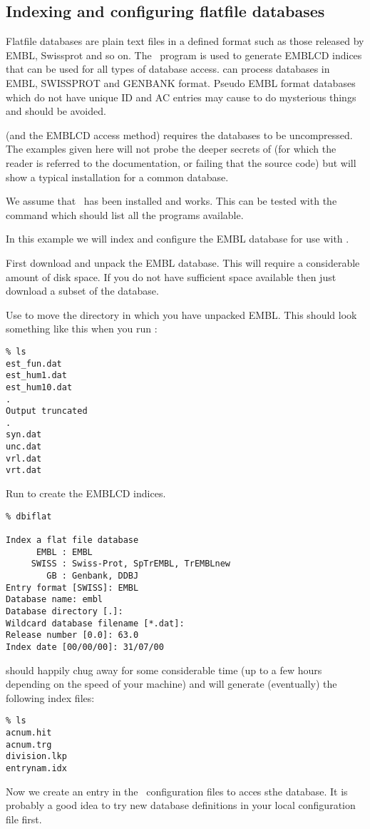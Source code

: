 \documentclass{report}
\begin{document}
	\subsection{Indexing and configuring flatfile databases}

Flatfile databases are plain text files in a defined format such as those released by EMBL, Swissprot and so on. The \EMBOSS\ program  is used to generate EMBLCD indices that can be used for all types of database access.  can process databases in EMBL, SWISSPROT and GENBANK format. Pseudo EMBL format databases which do not have unique ID and AC entries may cause  to do mysterious things and should be avoided.

 (and the EMBLCD access method) requires the databases to be uncompressed. The examples given here will not probe the deeper secrets of  (for which the reader is referred to the documentation, or failing that the source code) but will show a typical installation for a common database.

We assume that \EMBOSS\ has been installed and works. This can be tested with the command  which should list all the programs available.

In this example we will index and configure the EMBL database for use with \EMBOSS.

First download and unpack the EMBL database. This will require a considerable amount of disk space. If you do not have sufficient space available then just download a subset of the database.

Use  to move the directory in which you have unpacked EMBL. This should look something like this when you run :
\begin{verbatim}
% ls
est_fun.dat
est_hum1.dat
est_hum10.dat
.
Output truncated
.
syn.dat
unc.dat
vrl.dat
vrt.dat
\end{verbatim}
Run  to create the EMBLCD indices.
\begin{verbatim}
% dbiflat

Index a flat file database
      EMBL : EMBL
     SWISS : Swiss-Prot, SpTrEMBL, TrEMBLnew
        GB : Genbank, DDBJ
Entry format [SWISS]: EMBL   
Database name: embl
Database directory [.]: 
Wildcard database filename [*.dat]: 
Release number [0.0]: 63.0
Index date [00/00/00]: 31/07/00
\end{verbatim}
 should happily chug away for some considerable time (up to a few hours depending on the speed of your machine) and will generate (eventually) the following index files:
\begin{verbatim}
% ls
acnum.hit
acnum.trg
division.lkp
entrynam.idx
\end{verbatim}
Now we create an entry in the \EMBOSS\ configuration files to acces sthe database. It is probably a good idea to try new database definitions in your local configuration file first.
\end{document}
